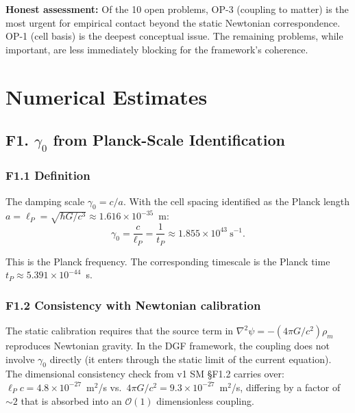 \documentclass[reprint]{revtex4-2}
\begin{document}
\textbf{Honest assessment:} Of the 10 open problems, OP-3 (coupling to matter) is the most urgent for empirical contact beyond the static Newtonian correspondence. OP-1 (cell basis) is the deepest conceptual issue. The remaining problems, while important, are less immediately blocking for the framework's coherence.

\section{Numerical Estimates}

\subsection{F1. $\gamma_0$ from Planck-Scale Identification}

\subsubsection{F1.1 Definition}

The damping scale $\gamma_0 = c/a$. With the cell spacing identified as the Planck length $a = \ell_P = \sqrt{\hbar G/c^3} \approx 1.616\times 10^{-35}$~m:
\begin{equation}
\boxed{\gamma_0 = \frac{c}{\ell_P} = \frac{1}{t_P} \approx 1.855\times 10^{43}~\text{s}^{-1}}.
\label{eq:gamma0_value}
\end{equation}

This is the Planck frequency. The corresponding timescale is the Planck time $t_P \approx 5.391\times 10^{-44}$~s.

\subsubsection{F1.2 Consistency with Newtonian calibration}

The static calibration requires that the source term in $\nabla^2\psi = -(4\pi G/c^2)\rho_m$ reproduces Newtonian gravity. In the DGF framework, the coupling does not involve $\gamma_0$ directly (it enters through the static limit of the current equation). The dimensional consistency check from v1 SM \S F1.2 carries over: $\ell_P c = 4.8\times 10^{-27}$~m$^2$/s vs.\ $4\pi G/c^2 = 9.3\times 10^{-27}$~m$^2$/s, differing by a factor of $\sim 2$ that is absorbed into an $\mathcal{O}(1)$ dimensionless coupling.
\end{document}

